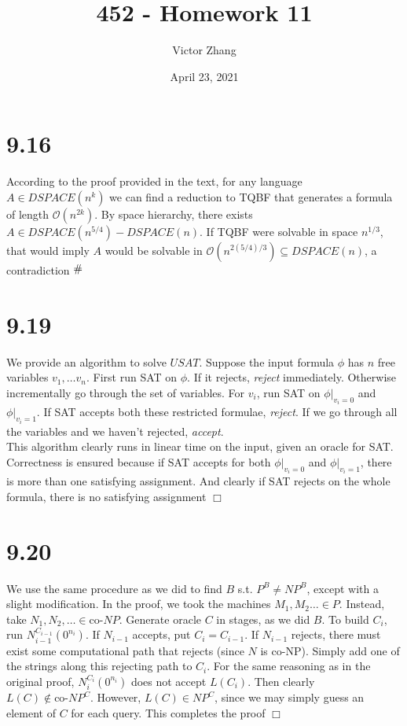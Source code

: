 \documentclass{article}
\title{452 - Homework 11}
\author{Victor Zhang}
\date{April 23, 2021}
\newcommand{\contra}{\raisebox{\depth}{\#}}
\begin{document}
\maketitle

\section*{9.16}
According to the proof provided in the text, for any language $A \in DSPACE(n^k)$ we can find a reduction to TQBF that generates a formula of length $\mathcal{O}(n^{2k})$. By space hierarchy, there exists $A \in DSPACE(n^{5/4}) - DSPACE(n)$. If TQBF were solvable in space $n^{1/3}$, that would imply $A$ would be solvable in $\mathcal{O}(n^{2(5/4)/3}) \subseteq DSPACE(n)$, a contradiction $\contra$ 

\section*{9.19}
We provide an algorithm to solve $USAT$. Suppose the input formula $\phi$ has $n$ free variables $v_1, \dots v_n$. First run SAT on $\phi$. If it rejects, \textit{reject} immediately. Otherwise incrementally go through the set of variables. For $v_i$, run SAT on $\phi\big\vert_{v_i = 0}$ and $\phi\big\vert_{v_i = 1}$. If SAT accepts both these restricted formulae, \textit{reject}. If we go through all the variables and we haven't rejected, \textit{accept}.\\
This algorithm clearly runs in linear time on the input, given an oracle for SAT. Correctness is ensured because if SAT accepts for both $\phi\big\vert_{v_i = 0}$ and $\phi\big\vert_{v_i = 1}$, there is more than one satisfying assignment. And clearly if SAT rejects on the whole formula, there is no satisfying assignment $\Box$

\section*{9.20}
We use the same procedure as we did to find $B$ s.t. $P^B \neq NP^B$, except with a slight modification. In the proof, we took the machines $M_1, M_2 \dots \in P$. Instead, take $N_1, N_2, \dots \in \text{co-}NP$. Generate oracle $C$ in stages, as we did $B$. To build $C_i$, run $N_{i-1}^{C_{i-1}}(0^{n_i})$. If $N_{i-1}$ accepts, put $C_i = C_{i-1}$. If $N_{i-1}$ rejects, there must exist some computational path that rejects (since $N$ is co-NP). Simply add one of the strings along this rejecting path to $C_i$. For the same reasoning as in the original proof, $N_i^{C_i}(0^{n_i})$ does not accept $L(C_i)$. Then clearly $L(C) \notin \text{co-}NP^C$. However, $L(C) \in NP^C$, since we may simply guess an element of $C$ for each query. This completes the proof $\Box$
\end{document}
